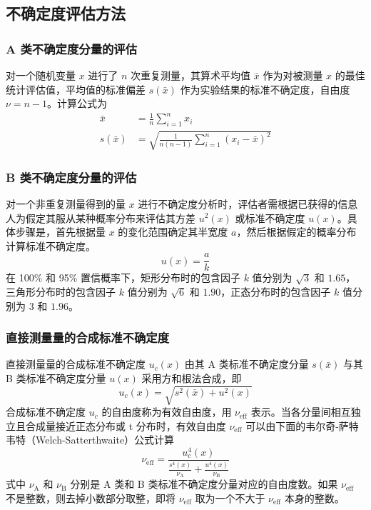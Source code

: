\subsection{不确定度评估方法}
    \subsubsection{A 类不确定度分量的评估}
    对一个随机变量 $x$ 进行了 $n$ 次重复测量，其算术平均值 $\bar{x}$ 作为对被测量 $x$ 的最佳统计评估值，平均值的标准偏差 $s(\bar{x})$ 作为实验结果的标准不确定度，自由度 $\nu=n-1$。计算公式为\\
    \begin{align}
        \bar{x}&=\frac{1}{n}\sum_{i=1}^{n}x_i \label{exp:amean} \\
        s(\bar{x})&=\sqrt{\frac{1}{n(n-1)}\sum_{i=1}^{n}(x_i-\bar{x})^2} \label{exp:astd}
    \end{align}

    \subsubsection{B 类不确定度分量的评估}
    对一个非重复测量得到的量 $x$ 进行不确定度分析时，评估者需根据已获得的信息人为假定其服从某种概率分布来评估其方差 $u^2(x)$ 或标准不确定度 $u(x)$。具体步骤是，首先根据量 $x$ 的变化范围确定其半宽度 $a$，然后根据假定的概率分布计算标准不确定度。\\
    \begin{equation}
        u(x) = \frac a k \label{exp:uncertaintyB}
    \end{equation}
    在 100\% 和 95\% 置信概率下，矩形分布时的包含因子 $k$ 值分别为 $\sqrt{3}$ 和 $1.65$，三角形分布时的包含因子 $k$ 值分别为 $\sqrt{6}$ 和 $1.90$，正态分布时的包含因子 $k$ 值分别为 $3$ 和 $1.96$。

    \subsubsection{直接测量量的合成标准不确定度}
    直接测量量的合成标准不确定度 $u_c(x)$ 由其 A 类标准不确定度分量 $s(\bar{x})$ 与其 B 类标准不确定度分量 $u(x)$ 采用方和根法合成，即\\
    \begin{equation}
        u_c(x) = \sqrt{s^2(\bar{x})+u^2(x)} \label{exp:uncertaintyCombine}
    \end{equation}
    合成标准不确定度 $u_c$ 的自由度称为有效自由度，用 $\nu_\text{eff}$ 表示。当各分量间相互独立且合成量接近正态分布或 t 分布时，有效自由度 $\nu_\text{eff}$ 可以由下面的韦尔奇-萨特韦特（Welch-Satterthwaite）公式计算\\
    \begin{equation}
        \nu_\text{eff}=\frac{u_c^4(x)}{\displaystyle\frac{s^4(x)}{\nu_\text{A}}+\frac{u^4(x)}{\nu_\text{B}}} \label{exp:validFreedom}
    \end{equation}
    式中 $\nu_\text{A}$ 和 $\nu_\text{B}$ 分别是 A 类和 B 类标准不确定度分量对应的自由度数。如果 $\nu_\text{eff}$ 不是整数，则去掉小数部分取整，即将 $\nu_\text{eff}$ 取为一个不大于 $\nu_\text{eff}$ 本身的整数。


